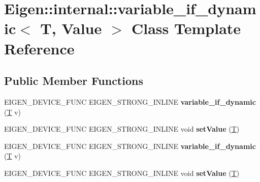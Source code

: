 \hypertarget{class_eigen_1_1internal_1_1variable__if__dynamic}{}\section{Eigen\+:\+:internal\+:\+:variable\+\_\+if\+\_\+dynamic$<$ T, Value $>$ Class Template Reference}
\label{class_eigen_1_1internal_1_1variable__if__dynamic}
\subsection*{Public Member Functions}
\begin{DoxyCompactItemize}
\item 
\mbox{\label{class_eigen_1_1internal_1_1variable__if__dynamic_abecde4c7d817c80ac0dd0132b5e931d4}} 
E\+I\+G\+E\+N\+\_\+\+D\+E\+V\+I\+C\+E\+\_\+\+F\+U\+NC E\+I\+G\+E\+N\+\_\+\+S\+T\+R\+O\+N\+G\+\_\+\+I\+N\+L\+I\+NE {\bfseries variable\+\_\+if\+\_\+dynamic} (\hyperlink{group___sparse_core___module}{T} v)
\item 
\mbox{\label{class_eigen_1_1internal_1_1variable__if__dynamic_accea2b8ca20ab0ff9264ef8e7d70cb2e}} 
E\+I\+G\+E\+N\+\_\+\+D\+E\+V\+I\+C\+E\+\_\+\+F\+U\+NC E\+I\+G\+E\+N\+\_\+\+S\+T\+R\+O\+N\+G\+\_\+\+I\+N\+L\+I\+NE void {\bfseries set\+Value} (\hyperlink{group___sparse_core___module}{T})
\item 
\mbox{\label{class_eigen_1_1internal_1_1variable__if__dynamic_abecde4c7d817c80ac0dd0132b5e931d4}} 
E\+I\+G\+E\+N\+\_\+\+D\+E\+V\+I\+C\+E\+\_\+\+F\+U\+NC E\+I\+G\+E\+N\+\_\+\+S\+T\+R\+O\+N\+G\+\_\+\+I\+N\+L\+I\+NE {\bfseries variable\+\_\+if\+\_\+dynamic} (\hyperlink{group___sparse_core___module}{T} v)
\item 
\mbox{\label{class_eigen_1_1internal_1_1variable__if__dynamic_accea2b8ca20ab0ff9264ef8e7d70cb2e}} 
E\+I\+G\+E\+N\+\_\+\+D\+E\+V\+I\+C\+E\+\_\+\+F\+U\+NC E\+I\+G\+E\+N\+\_\+\+S\+T\+R\+O\+N\+G\+\_\+\+I\+N\+L\+I\+NE void {\bfseries set\+Value} (\hyperlink{group___sparse_core___module}{T})
\end{DoxyCompactItemize}
